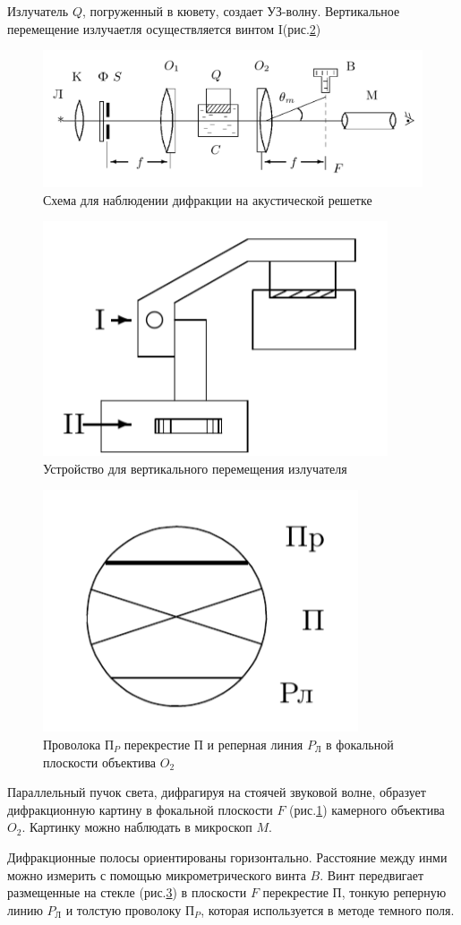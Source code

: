 \documentclass[a4paper,12pt]{article}
\begin{document}
Излучатель $Q$, погруженный в кювету, создает УЗ-волну. Вертикальное перемещение излучаетля осуществляется винтом I(рис.\ref{img5})

\begin{figure}[h]
\centering
\includegraphics[width=0.8\linewidth]{img4.png}
\caption{Схема для наблюдении дифракции на акустической решетке}
\label{img4}
\end{figure}

\begin{figure}[h]
\centering
\includegraphics[width=0.3\linewidth]{img5.png}
\caption{Устройство для вертикального перемещения излучателя}
\label{img5}
\end{figure}

\begin{figure}[h]
\centering
\includegraphics[width=0.3\linewidth]{img6.png}
\caption{Проволока $\text{П}_P$ перекрестие П и реперная линия $P_\text{Л}$ в фокальной плоскости объектива $O_2$}
\label{img6}
\end{figure}

Параллельный пучок света, дифрагируя на стоячей звуковой волне, образует дифракционную картину в фокальной плоскости $F$ (рис.\ref{img4}) камерного объектива $O_2$. Картинку можно наблюдать в микроскоп $M$.

Дифракционные полосы ориентированы горизонтально. Расстояние между инми можно измерить с помощью микрометрического винта $B$. Винт передвигает размещенные на стекле (рис.\ref{img6}) в плоскости $F$ перекрестие $\text{П}$, тонкую реперную линию $P_\text{Л}$ и толстую проволоку $\text{П}_P$, которая используется в методе темного поля.
\end{document}
